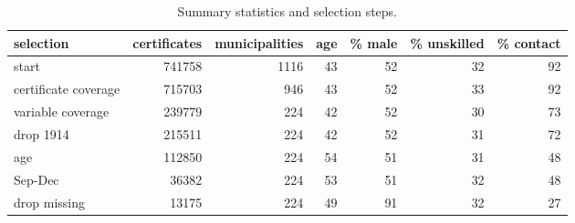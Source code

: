 \begin{table}

\caption{\label{tab:tab:sumselect}Summary statistics and selection steps.}
\centering
\begin{tabular}[t]{l|r|r|r|r|r|r}
\hline
selection & certificates & municipalities & age & \% male & \% unskilled & \% contact\\
\hline
start & 741758 & 1116 & 43 & 52 & 32 & 92\\
\hline
certificate coverage & 715703 & 946 & 43 & 52 & 33 & 92\\
\hline
variable coverage & 239779 & 224 & 42 & 52 & 30 & 73\\
\hline
drop 1914 & 215511 & 224 & 42 & 52 & 31 & 72\\
\hline
age & 112850 & 224 & 54 & 51 & 31 & 48\\
\hline
Sep-Dec & 36382 & 224 & 53 & 51 & 32 & 48\\
\hline
drop missing & 13175 & 224 & 49 & 91 & 32 & 27\\
\hline
\end{tabular}
\end{table}
